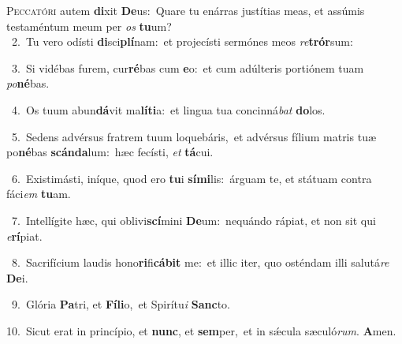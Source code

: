 \lettrine{\initial\textcolor{\initialcolor}{P}}{eccatóri} autem \textbf{di}\-xit \textbf{De}\-us:~\star Quare tu enárras justítias meas, et assúmis testaméntum meum per \textit{os} \textbf{tu}\-um?\\
{\numbfont\textcolor{\numbcolor}{~2.}}~Tu vero odísti \textbf{di}\-sci\-\textbf{plí}\-nam:~\star et projecísti sermónes meos \textit{re}\-\textbf{trór}sum:\par
{\numbfont\textcolor{\numbcolor}{~3.}}~Si vidébas furem, cur\-\textbf{ré}\-bas cum \textbf{e}\-o:~\star et cum adúlteris portiónem tuam \textit{po}\-\textbf{né}bas.\par
{\numbfont\textcolor{\numbcolor}{~4.}}~Os tuum abun\-\textbf{dá}\-vit ma\-\textbf{lí}\-\textbf{ti}a:~\star et lingua tua concinná\textit{bat} \textbf{do}\-los.\par
{\numbfont\textcolor{\numbcolor}{~5.}}~Sedens advérsus fratrem tuum loquebáris,~\dagger et advérsus fílium matris tuæ po\-\textbf{né}\-bas \textbf{scán}\-\textbf{da}lum:~\star hæc fecísti, \textit{et} \textbf{tá}\-cui.\par
{\numbfont\textcolor{\numbcolor}{~6.}}~Existimásti, iníque, quod ero \textbf{tu}\-i \textbf{sí}\-\textbf{mi}lis:~\star árguam te, et státuam contra fáci\textit{em} \textbf{tu}\-am.\par
{\numbfont\textcolor{\numbcolor}{~7.}}~Intellígite hæc, qui oblivi\-\textbf{scí}\-mini \textbf{De}\-um:~\star nequándo rápiat, et non sit qui \textit{e}\-\textbf{rí}piat.\par
{\numbfont\textcolor{\numbcolor}{~8.}}~Sacrifícium laudis hono\-\textbf{ri}\-fi\-\textbf{cá}\-\textbf{bit} me:~\star et illic iter, quo osténdam illi salutá\textit{re} \textbf{De}\-i.\par
{\numbfont\textcolor{\numbcolor}{~9.}}~Glória \textbf{Pa}\-tri, et \textbf{Fí}\-\textbf{li}o,~\star et Spirítu\textit{i} \textbf{Sanc}\-to.\par
{\numbfont\textcolor{\numbcolor}{10.}}~Sicut erat in princípio, et \textbf{nunc}\-, et \textbf{sem}\-per,~\star et in sǽcula sæculó\-\textit{rum}\-. \textbf{A}\-men.\par
